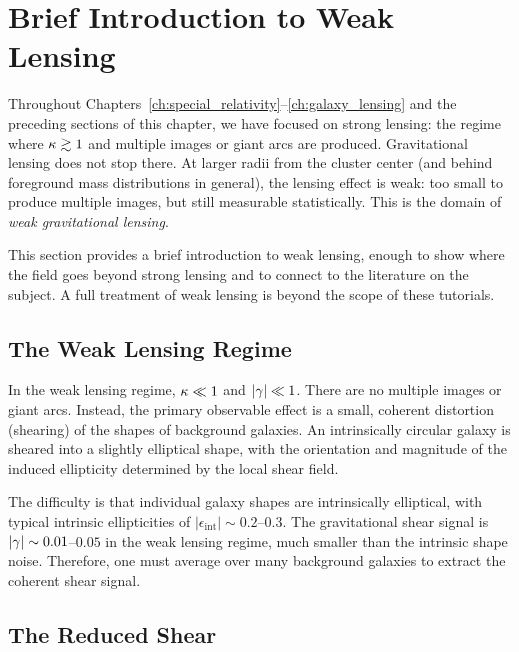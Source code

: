 \section{Brief Introduction to Weak Lensing}
\label{sec:weak_lensing}

Throughout Chapters~\ref{ch:special_relativity}--\ref{ch:galaxy_lensing} and the preceding sections of this chapter,
we have focused on strong lensing: the regime where
$\kappa \gtrsim 1$ and multiple images or giant arcs are produced.
Gravitational lensing does not stop there.
At larger radii from the cluster center (and behind foreground mass
distributions in general), the lensing effect is weak: too small
to produce multiple images, but still measurable statistically.  This
is the domain of \emph{weak gravitational lensing}.

This section provides a brief introduction to weak lensing, enough
to show where the field goes beyond strong lensing and to connect to
the literature on the subject.  A full treatment of weak lensing is
beyond the scope of these tutorials.

\subsection{The Weak Lensing Regime}

In the weak lensing regime, $\kappa \ll 1$ and $|\gamma| \ll 1$.
There are no multiple images or giant arcs.  Instead, the primary
observable effect is a small, coherent distortion (shearing)
of the shapes of background galaxies.  An intrinsically circular
galaxy is sheared into a slightly elliptical shape, with the
orientation and magnitude of the induced ellipticity determined by the
local shear field.

The difficulty is that individual galaxy shapes are intrinsically
elliptical, with typical intrinsic ellipticities of
$|\epsilon_{\mathrm{int}}| \sim 0.2$--$0.3$.  The gravitational
shear signal is $|\gamma| \sim 0.01$--$0.05$ in the weak lensing
regime, much smaller than the intrinsic shape noise.  Therefore,
one must average over many background galaxies to extract
the coherent shear signal.

\subsection{The Reduced Shear}

